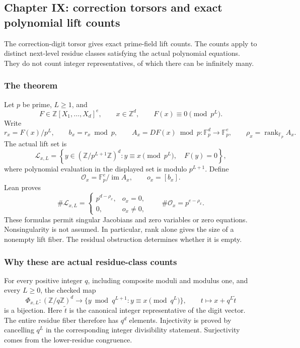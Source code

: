 \hypertarget{cont2:paper-ix-correction-torsors-and-exact-polynomial-lift-counts}{%
\subsection{Chapter IX: correction torsors and exact polynomial lift
counts}\label{cont2:paper-ix-correction-torsors-and-exact-polynomial-lift-counts}}

The correction-digit torsor gives exact prime-field lift counts. The counts apply to distinct next-level
residue classes satisfying the actual polynomial equations. They do not
count integer representatives, of which there can be infinitely many.

\hypertarget{cont2:the-theorem}{%
\subsubsection{The theorem}\label{cont2:the-theorem}}

Let \(p\) be prime, \(L\ge1\), and \[
F\in\mathbb Z[X_1,\ldots,X_d]^e,
\qquad x\in\mathbb Z^d,
\qquad F(x)\equiv0\pmod{p^L}.
\] Write \[
r_x=F(x)/p^L,\qquad b_x=r_x\bmod p,
\qquad A_x=DF(x)\bmod p:\mathbb F_p^d\longrightarrow\mathbb F_p^e,
\qquad \rho_x=\operatorname{rank}_{\mathbb F_p}A_x.
\] The actual lift set is \[
\mathcal L_{x,L}=
\left\{y\in(\mathbb Z/p^{L+1}\mathbb Z)^d:
 y\equiv x\pmod{p^L},\quad F(y)=0\right\},
\] where polynomial evaluation in the displayed set is modulo
\(p^{L+1}\). Define \[
\mathcal O_x=\mathbb F_p^e/\operatorname{im}A_x,
\qquad o_x=[b_x].
\] Lean proves \[
\boxed{
\#\mathcal L_{x,L}=
\begin{cases}
p^{d-\rho_x},&o_x=0,\\
0,&o_x\ne0,
\end{cases}
\qquad
\#\mathcal O_x=p^{e-\rho_x}.
}
\] These formulas permit singular Jacobians and zero variables or zero
equations. Nonsingularity is not assumed. In particular, rank alone
gives the size of a nonempty lift fiber. The residual obstruction
determines whether it is empty.

\hypertarget{cont2:why-these-are-actual-residue-class-counts}{%
\subsubsection{Why these are actual residue-class
counts}\label{cont2:why-these-are-actual-residue-class-counts}}

For every positive integer \(q\), including composite moduli and modulus
one, and every \(L\ge0\), the checked map \[
\Phi_{x,L}:(\mathbb Z/q\mathbb Z)^d\longrightarrow
\{y\bmod q^{L+1}:y\equiv x\pmod{q^L}\},
\qquad t\longmapsto x+q^L\widetilde t
\] is a bijection. Here \(\widetilde t\) is the canonical integer
representative of the digit vector. The entire residue fiber therefore
has \(q^d\) elements. Injectivity is proved by cancelling \(q^L\) in the
corresponding integer divisibility statement. Surjectivity comes from
the lower-residue congruence.

